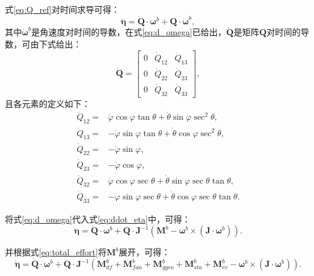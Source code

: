 式\eqref{eq:Q_ref}对时间求导可得：
\begin{equation}
    \ddot{\boldsymbol{\eta}} = \dot{\boldsymbol{Q}} \cdot \boldsymbol{\omega}^b + \boldsymbol{Q} \cdot \dot{\boldsymbol{\omega}}^b,
    \label{eq:ddot_eta}
\end{equation}
其中\(\dot{\boldsymbol{\omega}}^b\)是角速度对时间的导数，在式\eqref{eq:d_omega}已给出，\(\dot{\boldsymbol{Q}}\)是矩阵\(\boldsymbol{Q}\)对时间的导数，可由下式给出：
\begin{equation}
    \dot{\boldsymbol{Q}} = 
    \begin{bmatrix}
        0 & \dot{Q}_{12} & \dot{Q}_{13} \\
        0 & \dot{Q}_{22} & \dot{Q}_{23} \\
        0 & \dot{Q}_{32} & \dot{Q}_{33}
    \end{bmatrix},
\end{equation}
且各元素的定义如下：
\begin{equation}
    \begin{aligned}
        \dot{Q}_{12} =& \dot{\varphi}\cos\varphi\tan\theta + \dot{\theta}\sin\varphi\sec^2\theta, \\
        \dot{Q}_{13} =& -\dot{\varphi}\sin\varphi\tan\theta + \dot{\theta}\cos\varphi\sec^2\theta, \\
        \dot{Q}_{22} =& -\dot{\varphi}\sin\varphi, \\
        \dot{Q}_{23} =& -\dot{\varphi}\cos\varphi, \\
        \dot{Q}_{32} =& \dot{\varphi}\cos\varphi\sec\theta + \dot{\theta}\sin\varphi\sec\theta\tan\theta, \\
        \dot{Q}_{33} =& -\dot{\varphi}\sin\varphi\sec\theta + \dot{\theta}\cos\varphi\sec\theta\tan\theta.
    \end{aligned}
\end{equation}

将式\eqref{eq:d_omega}代入式\eqref{eq:ddot_eta}中，可得：
\begin{equation}
    \ddot{\boldsymbol{\eta}} = \dot{\boldsymbol{Q}} \cdot \boldsymbol{\omega}^b + \boldsymbol{Q} \cdot \boldsymbol{J}^{-1}(\boldsymbol{M}^b - \boldsymbol{\omega}^b\times(\boldsymbol{J}\cdot\boldsymbol{\omega}^b)).
    \label{eq:ddot_eta_ref}
\end{equation}

并根据式\eqref{eq:total_effort}将\(\boldsymbol{M}^b\)展开，可得：
\begin{equation}
    \ddot{\boldsymbol{\eta}} = \dot{\boldsymbol{Q}} \cdot \boldsymbol{\omega}^b + \boldsymbol{Q} \cdot \boldsymbol{J}^{-1}(\boldsymbol{M}_{df}^b + \boldsymbol{M}_{fan}^b + \boldsymbol{M}_{gyro}^b + \boldsymbol{M}_{sta}^b + \boldsymbol{M}_{cv}^b - \boldsymbol{\omega}^b\times(\boldsymbol{J}\cdot\boldsymbol{\omega}^b)).
\end{equation}

